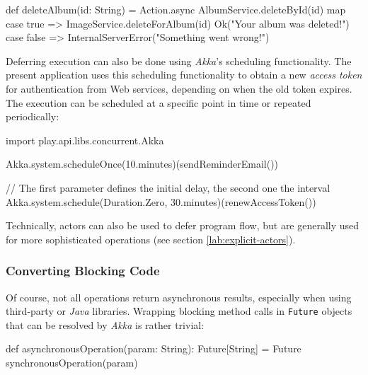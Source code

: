 \begin{JavaCode}
def deleteAlbum(id: String) = Action.async {
    AlbumService.deleteById(id) map {
        case true =>
            ImageService.deleteForAlbum(id)
            Ok("Your album was deleted!")
        case false =>
            InternalServerError("Something went wrong!")
    }
}
 
\end{JavaCode}

Deferring execution can also be done using \textit{Akka}'s scheduling functionality. The present application uses this scheduling functionality to obtain a new \textit{access token} for authentication from Web services, depending on when the old token expires. The execution can be scheduled at a specific point in time or repeated periodically:
\begin{JavaCode}
import play.api.libs.concurrent.Akka

Akka.system.scheduleOnce(10.minutes)(sendReminderEmail())

// The first parameter defines the initial delay, the second one the interval
Akka.system.schedule(Duration.Zero, 30.minutes)(renewAccessToken())

\end{JavaCode}

Technically, actors can also be used to defer program flow, but are generally used for more sophisticated operations (see section \ref{lab:explicit-actors}).

\subsubsection*{Converting Blocking Code}
Of course, not all operations return asynchronous results, especially when using third-party or \textit{Java} libraries. Wrapping blocking method calls in \texttt{Future} objects that can be resolved by \textit{Akka} is rather trivial:
\begin{JavaCode}
def asynchronousOperation(param: String): Future[String] = {
    Future {
        synchronousOperation(param)
    }
}
\end{JavaCode}

